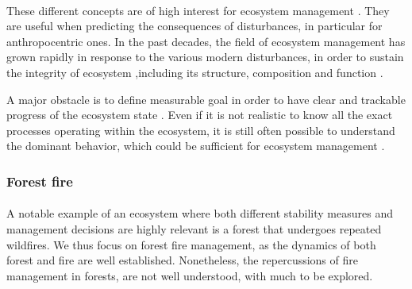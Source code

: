 \documentclass{article}
\begin{document}
\paragraph{}

These different concepts are of high interest for ecosystem management \citep{mumby_ecological_2014}. They are useful when predicting the consequences of disturbances, in particular for anthropocentric ones. In the past decades, the field of ecosystem management has grown rapidly \citep{grumbine_reflections_1997} in response to the various modern disturbances, in order to sustain the integrity of ecosystem ,including its structure, composition and function \citep{jensen1994overview}. 

A major obstacle is to define measurable goal in order to have clear and trackable progress of the ecosystem state \citep{slocombe_forum:_1998}. Even if it is not realistic to know all the exact processes operating within the ecosystem, it is still often possible to understand the dominant behavior, which could be sufficient for ecosystem management \citep{mori_ecosystem_2011, slocombe_forum:_1998, stanley_ecosystem_1995}.

\subsubsection*{Forest fire}

\paragraph{}
A notable example of an ecosystem where both different stability measures and management decisions are highly relevant is a forest that undergoes repeated wildfires. We thus focus on forest fire management, as the dynamics of both forest and fire are well established. Nonetheless, the repercussions of fire management in forests, are not well understood, with much to be explored.

\paragraph{}
\end{document}
